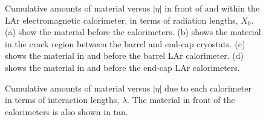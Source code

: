 \begin{figure}
{	}\hfill
	\caption{Cumulative amounts of material versus $|\eta|$ in front of and within the LAr electromagnetic calorimeter, in terms of radiation lengths, $X_0$. (a) show the material before the calorimeters. (b) shows the material in the crack region between the barrel and end-cap cryostats. (c) shows the material in and before the barrel LAr calorimeter. (d) shows the material in and before the end-cap LAr calorimeters.}
	\label{fig:ATLAS-calorimeters-X0}
\end{figure}

\begin{figure}
	\centering
	\caption{Cumulative amounts of material versus $|\eta|$ due to each calorimeter in terms of interaction lengths, $\lambda$. The material in front of the calorimeters is also shown in tan.}
	\label{fig:ATLAS-calorimeters-lambda0}
\end{figure}



